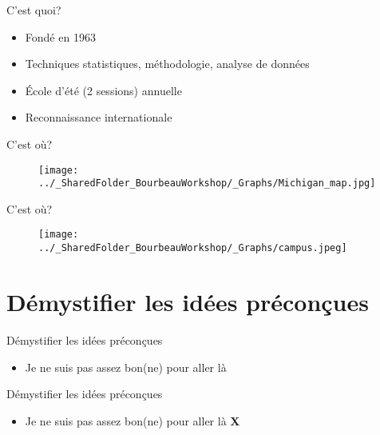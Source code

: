 \documentclass{beamer}
\begin{document}
\begin{frame}{C'est quoi?}
\begin{itemize}
    \item Fondé en 1963 
    \item Techniques statistiques, méthodologie, analyse de données
    \item École d'été (2 sessions) annuelle
    \item Reconnaissance internationale 
\end{itemize}
\end{frame}

\begin{frame}{C'est où?}
\begin{figure}
    \centering
    \texttt{[image: ../\_SharedFolder\_BourbeauWorkshop/\_Graphs/Michigan\_map.jpg]}
    \label{fig:my_label1}
\end{figure}
\end{frame}

\begin{frame}{C'est où?}
\begin{figure}
    \centering
    \texttt{[image: ../\_SharedFolder\_BourbeauWorkshop/\_Graphs/campus.jpeg]}
    \label{fig:my_label2}
\end{figure}
\end{frame}


\section{Démystifier les idées préconçues}

\begin{frame}{Démystifier les idées préconçues}
\begin{itemize}
    \item Je ne suis pas assez bon(ne) pour aller là %
\end{itemize}
\end{frame}

\begin{frame}{Démystifier les idées préconçues}
\begin{itemize}
    \item Je ne suis pas assez bon(ne) pour aller là \Large{\textbf{\color{red}X}}
\end{itemize}
\end{frame}
\end{document}
